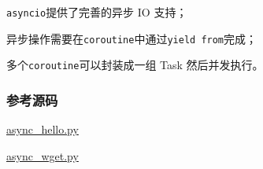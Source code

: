 \texttt{asyncio}提供了完善的异步 IO 支持；

异步操作需要在\texttt{coroutine}中通过\texttt{yield\ from}完成；

多个\texttt{coroutine}可以封装成一组 Task 然后并发执行。

\hypertarget{ux53c2ux8003ux6e90ux7801}{%
\subsubsection{参考源码}\label{ux53c2ux8003ux6e90ux7801}}

\href{https://github.com/michaelliao/learn-python3/blob/master/samples/async/async_hello.py}{async\_hello.py}

\href{https://github.com/michaelliao/learn-python3/blob/master/samples/async/async_wget.py}{async\_wget.py}

